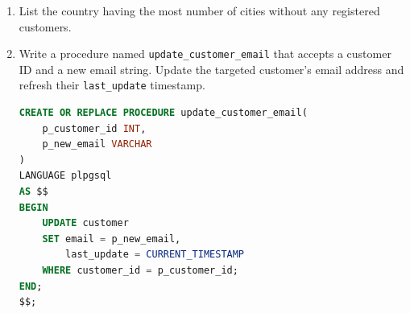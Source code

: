 \documentclass[12pt,a4paper]{article}
\newif\ifshowsolutions
\begin{document}
\begin{enumerate}



\item List the country having the most number of cities without any registered customers.
\ifshowsolutions
\begin{lstlisting}[language=SQL]
SELECT 
    co.country, 
    COUNT(ci.city_id) AS empty_cities_count
FROM country co
JOIN city ci ON co.country_id = ci.country_id
LEFT JOIN address a ON ci.city_id = a.city_id
LEFT JOIN customer c ON a.address_id = c.address_id
WHERE c.customer_id IS NULL
GROUP BY co.country_id, co.country
ORDER BY empty_cities_count DESC
LIMIT 1;
\end{lstlisting}
\fi

\item Write a procedure named \texttt{update\_customer\_email} that accepts a customer ID and a new email string. Update the targeted customer's email address and refresh their \texttt{last\_update} timestamp.

\ifshowsolutions
\begin{lstlisting}[language=SQL]
CREATE OR REPLACE PROCEDURE update_customer_email(
    p_customer_id INT,
    p_new_email VARCHAR
)
LANGUAGE plpgsql
AS $$
BEGIN
    UPDATE customer
    SET email = p_new_email,
        last_update = CURRENT_TIMESTAMP
    WHERE customer_id = p_customer_id;
END;
$$;


\end{lstlisting}
\end{enumerate}
\end{document}

